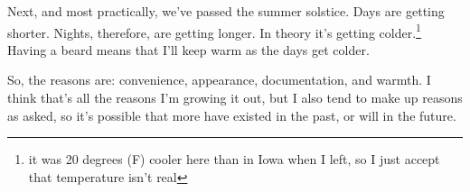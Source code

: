 \documentclass[12pt]{article}[titlepage]
\newcommand{\1}{\={a}}
\newcommand{\2}{\={e}}
\newcommand{\3}{\={\i}}
\newcommand{\4}{\=o}
\newcommand{\5}{\=u}
\newcommand{\6}{\={A}}
\renewcommand{\,}{\textsuperscript{,}}
\begin{document}
Next, and most practically, we've passed the summer solstice.
Days are getting shorter.
Nights, therefore, are getting longer.
In theory it's getting colder.\footnote{it was 20 degrees (F) cooler here than in Iowa when I left, so I just accept that temperature isn't real}
Having a beard means that I'll keep warm as the days get colder.

So, the reasons are: convenience, appearance, documentation, and warmth.
I think that's all the reasons I'm growing it out, but I also tend to make up reasons as asked, so it's possible that more have existed in the past, or will in the future.
\end{document}
